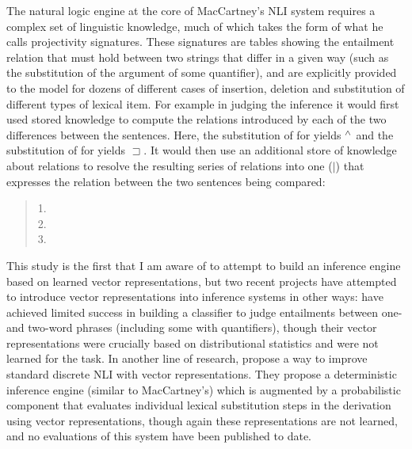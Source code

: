 The natural logic engine at the core of MacCartney's \cite{maccartney2009natural} NLI system requires a complex set of linguistic knowledge, much of which takes the form of what he calls projectivity signatures. These signatures are tables showing the entailment relation that must hold between two strings that differ in a given way (such as the substitution of the argument of some quantifier), and are explicitly provided to the model
for dozens of different cases of insertion, deletion and substitution of different types of lexical item. For example in judging the inference  it would first used stored knowledge to compute the relations introduced by each of the two differences between the sentences. Here, the substitution of  for   yields $\mathbin{^{\wedge}}$ and the substitution of  for  yields $\sqsupset$. It would then use an additional store of knowledge about relations to resolve the resulting series of relations into one ($|$) that expresses the relation between the two sentences being compared:
\begin{quote}

1. \\
2. \\
3. 

\end{quote}

This study is the first that I am aware of to attempt to build an inference engine based on learned vector representations, but two recent projects have attempted to introduce vector representations into inference systems in other ways: 
\citet{baroni2012entailment} have achieved limited success in building a classifier to judge entailments between one- and two-word phrases (including some with quantifiers), though their vector representations were crucially based on distributional statistics and were not  learned for the task.
In another line of research, \citet{garrette2013formal} propose a way to improve standard discrete NLI with vector representations. They propose a deterministic inference engine (similar to MacCartney's) which is augmented by a probabilistic component that evaluates individual lexical substitution steps in the derivation using vector representations, though again these representations are not learned, and no evaluations of this system have been published to date.
\label{sec2}

